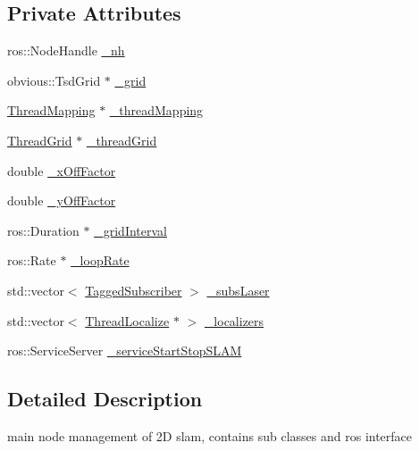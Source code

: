 \subsection*{Private Attributes}
\begin{DoxyCompactItemize}
\item 
ros\-::\-Node\-Handle \hyperlink{classohm__tsd__slam__ref_1_1SlamNode_a2e2b86d2d3ddff889a33152197e42894}{\-\_\-nh}
\item 
obvious\-::\-Tsd\-Grid $\ast$ \hyperlink{classohm__tsd__slam__ref_1_1SlamNode_a2b737790f425b4397bb7fb39373d4c3e}{\-\_\-grid}
\item 
\hyperlink{classohm__tsd__slam__ref_1_1ThreadMapping}{Thread\-Mapping} $\ast$ \hyperlink{classohm__tsd__slam__ref_1_1SlamNode_afdc6f1e42ee4910090dd49e84aa3cd82}{\-\_\-thread\-Mapping}
\item 
\hyperlink{classohm__tsd__slam__ref_1_1ThreadGrid}{Thread\-Grid} $\ast$ \hyperlink{classohm__tsd__slam__ref_1_1SlamNode_aa8894ed7f5c7413c1cfe5da64e3ac5b5}{\-\_\-thread\-Grid}
\item 
double \hyperlink{classohm__tsd__slam__ref_1_1SlamNode_ad57ec9810293549dc803209a950a776f}{\-\_\-x\-Off\-Factor}
\item 
double \hyperlink{classohm__tsd__slam__ref_1_1SlamNode_a591fdd2fc92e9fd53112b36f0125cf51}{\-\_\-y\-Off\-Factor}
\item 
ros\-::\-Duration $\ast$ \hyperlink{classohm__tsd__slam__ref_1_1SlamNode_a00ff10e215f1e307fca09351b25cc7c5}{\-\_\-grid\-Interval}
\item 
ros\-::\-Rate $\ast$ \hyperlink{classohm__tsd__slam__ref_1_1SlamNode_a09e9b76d84f565257c0aacda187c82ec}{\-\_\-loop\-Rate}
\item 
std\-::vector$<$ \hyperlink{structohm__tsd__slam__ref_1_1TaggedSubscriber}{Tagged\-Subscriber} $>$ \hyperlink{classohm__tsd__slam__ref_1_1SlamNode_a65b1147fbe5c773c55a7e2b640b77d01}{\-\_\-subs\-Laser}
\item 
std\-::vector$<$ \hyperlink{classohm__tsd__slam__ref_1_1ThreadLocalize}{Thread\-Localize} $\ast$ $>$ \hyperlink{classohm__tsd__slam__ref_1_1SlamNode_abe1e2022599a8ce220de76b142486ea8}{\-\_\-localizers}
\item 
ros\-::\-Service\-Server \hyperlink{classohm__tsd__slam__ref_1_1SlamNode_a2941b11fc25f02fad3467297f0260fec}{\-\_\-service\-Start\-Stop\-S\-L\-A\-M}
\end{DoxyCompactItemize}


\subsection{Detailed Description}
main node management of 2\-D slam, contains sub classes and ros interface 

